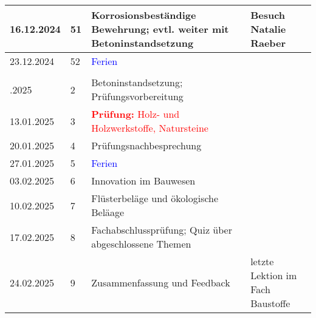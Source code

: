 \documentclass[
11pt,
captions=tableheading,
headings=big,
headsepline,
footsepline, 
captions=tableheading,
parskip=half-,
]{scrartcl}
\newcommand{\red}[1]{\textcolor{red}{#1}}
\begin{document}
\begin{table}[H]
\begin{tabular}{llp{8.5cm}p{3.5cm}}
        16.12.2024     & 51          & Korrosionsbeständige Bewehrung; evtl. weiter mit Betoninstandsetzung           & Besuch Natalie Raeber             \\
        \midrule
        23.12.2024     & 52          & \textcolor{blue}{Ferien}                                                       & {}                               \\
        \midrule
        \\ \addlinespace
        \midrule
        06.01.2025     & 2           & Betoninstandsetzung; Prüfungsvorbereitung                                      & {}                               \\
        13.01.2025     & 3           & \red{\textbf{Prüfung:} Holz- und Holzwerkstoffe, Natursteine}                  & {}                               \\
        20.01.2025     & 4           & Prüfungsnachbesprechung                                                        & {}                               \\
        \midrule
        27.01.2025     & 5           & \textcolor{blue}{Ferien}                                                       & {}                               \\
        \midrule
        03.02.2025     & 6           & Innovation im Bauwesen                                                         & {}                               \\
        10.02.2025     & 7           & Flüsterbeläge  und ökologische Beläage                                                               & {}                               \\
        17.02.2025     & 8           & Fachabschlussprüfung; Quiz über abgeschlossene Themen                    & {}                               \\
        24.02.2025     & 9           & Zusammenfassung und Feedback                                                   & letzte Lektion im Fach Baustoffe \\
        \bottomrule
    \end{tabular}
\end{table}
\end{document}
